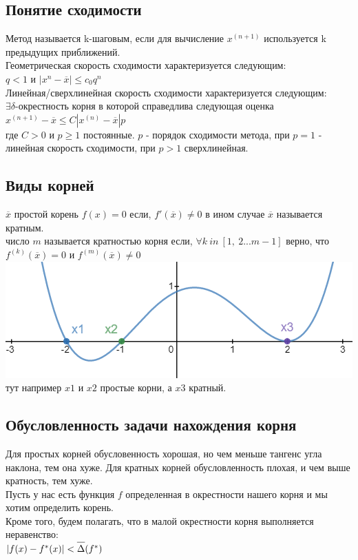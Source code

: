 \documentclass[16pt]{article}
\begin{document}
			\subsection{Понятие сходимости}
			Метод называется k-шаговым, если для вычисление $x^{(n+1)}$ используется k предыдущих приближений.\\
			Геометрическая скорость сходимости характеризуется следующим:\\
			$q < 1$ и $|x^{n} - \overline{x}| \leq c_0 q^n$\\
			Линейная/сверхлинейная скорость сходимости характеризуется следующим:\\
			$\exists \delta$-окрестность корня в которой справедлива следующая оценка\\
			$x^{(n+1)}-\overline{x} \leq C|x^{(n)}-\overline{x}|p$\\
			где $C>0$ и $p \geq 1$ постоянные. $p$ - порядок сходимости метода, при $p=1$ - линейная скорость сходимости, при $p>1$ сверхлинейная. 
			\subsection{Виды корней}
			$\overline{x}$ простой корень $f(x)=0$ если, $f'(\overline{x})\neq0$ в ином случае $\overline{x}$ называется кратным.\\
			число $m$ называется кратностью корня если, $\forall k\ in\ [1,\ 2...m-1]$ верно, что $f^{(k)}(\overline{x})=0$ и $f^{(m)}(\overline{x})\neq 0$\\ 
			\includegraphics{roots.png}\\
			тут например $x1$ и $x2$ простые корни, а $x3$ кратный.
			\subsection{Обусловленность задачи нахождения корня}
			Для простых корней обусловенность хорошая, но чем меньше тангенс угла наклона, тем она хуже. Для кратных корней обусловленность плохая, и чем выше кратность, тем хуже.\\
			Пусть у нас есть функция $f$ определенная в окрестности нашего корня и мы хотим определить корень.\\
			Кроме того, будем полагать, что в малой окрестности корня выполняется неравенство:\\
			$|f(x)-f^{*}(x)|<\overline{\raisebox{3mm}{}\Delta}(f^{*})$\\
\end{document}
